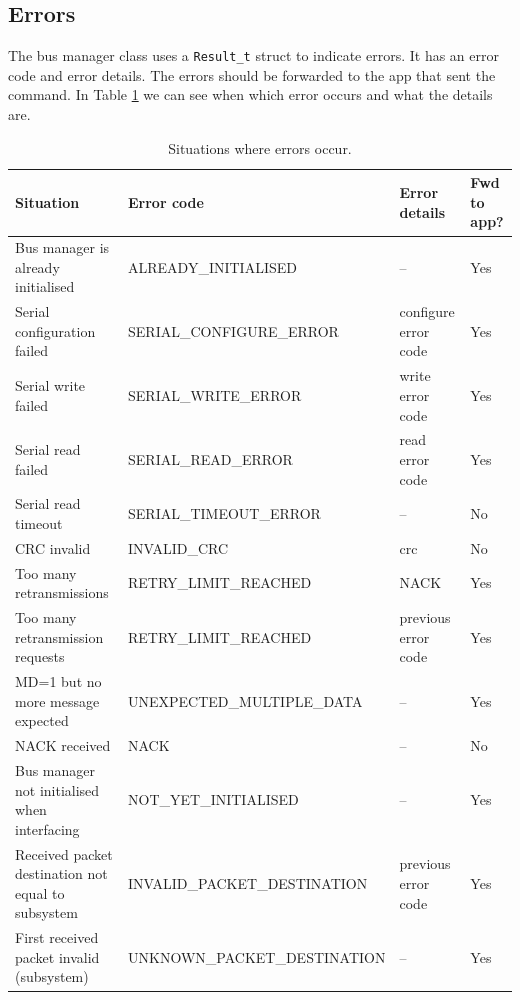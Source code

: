 \subsection{Errors}
The bus manager class uses a \texttt{Result\_t} struct to indicate errors. It has an error code and error details. The errors should be forwarded to the app that sent the command. In Table \ref{tab:errors} we can see when which error occurs and what the details are.

\begin{table}[H]
\centering
\begin{tabular}{|p{6cm}|p{5.5cm}|p{3cm}|p{1cm}|}
	\hline
	\textbf{Situation} & \textbf{Error code} & \textbf{Error details} & \textbf{Fwd to app?} \\\hline
	Bus manager is already initialised & ALREADY\_INITIALISED & -- & Yes\\\hline
	Serial configuration failed & SERIAL\_CONFIGURE\_ERROR & configure error code & Yes\\\hline
	Serial write failed & SERIAL\_WRITE\_ERROR & write error code & Yes \\\hline
	Serial read failed & SERIAL\_READ\_ERROR & read error code & Yes \\\hline
	Serial read timeout & SERIAL\_TIMEOUT\_ERROR & -- & No \\\hline
	CRC invalid & INVALID\_CRC & crc & No \\\hline
	Too many retransmissions & RETRY\_LIMIT\_REACHED & NACK & Yes \\\hline
	Too many retransmission requests & RETRY\_LIMIT\_REACHED & previous error code & Yes \\\hline
	MD=1 but no more message expected & UNEXPECTED\_MULTIPLE\_DATA & --& Yes \\\hline
	NACK received & NACK & -- & No \\\hline
	Bus manager not initialised when interfacing & NOT\_YET\_INITIALISED & -- & Yes \\\hline
	Received packet destination not equal to subsystem & INVALID\_PACKET\_DESTINATION & previous error code & Yes \\\hline
	First received packet invalid (subsystem) & UNKNOWN\_PACKET\_DESTINATION & -- & Yes \\\hline
\end{tabular}
\caption{Situations where errors occur.}
\label{tab:errors}
\end{table}

